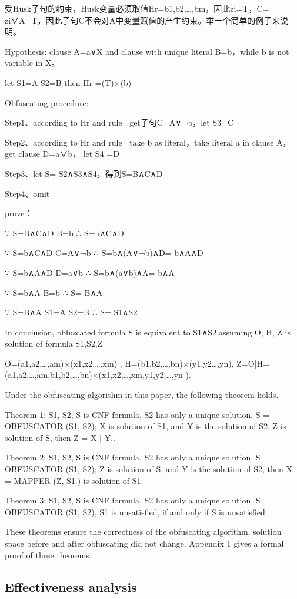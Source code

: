 \documentclass[runningheads,a4paper]{llncs}
\begin{document}
受Husk子句的约束，Husk变量必须取值Hr={b1,b2,…,bm}，因此zi=T，C= zi∨A=T，因此子句C不会对A中变量赋值的产生约束。举一个简单的例子来说明。

\noindent Hypothesis: clause A=a∨X and clause with unique literal B=b，while b is not variable in X。

let S1=A S2=B then Hr ={(T)×(b) } 

\noindent Obfuscating procedure:

Step1、according to Hr and rule ，get子句C=A∨¬b，let S3=C

Step2、according to Hr and rule ，take b as literal，take literal a in clause A，get clause D=a∨b， let S4 =D

Step3、let S= S2∧S3∧S4，得到S=B∧C∧D

Step4、omit

\noindent prove：

∵ S=B∧C∧D  B=b     ∴ S=b∧C∧D

∵ S=b∧C∧D  C=A∨¬b ∴ S=b∧(A∨¬b)∧D= b∧A∧D

∵ S=b∧A∧D  D=a∨b  ∴ S=b∧(a∨b)∧A= b∧A

∵ S=b∧A     B=b      ∴ S= B∧A 

∵ S=B∧A    S1=A  S2=B   ∴ S= S1∧S2

In conclusion, obfuscated formula S is equivalent to S1∧S2,assuming O, H, Z is solution of formula S1,S2,Z 

O={(a1,a2,…,am)×(x1,x2,…,xm) }, H={(b1,b2,…,bn)×(y1,y2…,yn)}, Z=O|H={(a1,a2,…,am,b1,b2,…,bn)×(x1,x2,…,xm,y1,y2,…,yn )}.

Under the obfuscating algorithm in this paper, the following theorem holds.

Theorem 1: S1, S2, S is CNF formula, S2 has only a unique solution, S = OBFUSCATOR (S1, S2); X is solution of S1, and Y is the solution of S2. Z is solution of S, then Z = X | Y,.

Theorem 2: S1, S2, S is CNF formula, S2 has only a unique solution, S = OBFUSCATOR (S1, S2); Z is solution of S, and Y is the solution of S2, then X = MAPPER (Z, S1.) is solution of S1.

Theorem 3: S1, S2, S is CNF formula, S2 has only a unique solution, S = OBFUSCATOR (S1, S2), S1 is unsatisfied, if and only if S is unsatisfied.

These theorems ensure the correctness of the obfuscating algorithm, solution space before and after obfuscating did not change. Appendix 1 gives a formal proof of these theorems.
\subsection{Effectiveness analysis}
\end{document}
